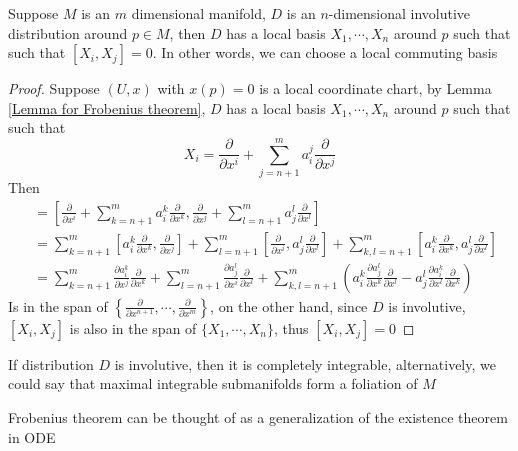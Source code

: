 \documentclass[../main.tex]{subfiles}
\begin{document}
\begin{corollary}\label{Involutive distribution ensure the existence of commuting basis}
Suppose $M$ is an $m$ dimensional manifold, $D$ is an $n$-dimensional involutive distribution around $p\in M$, then $D$ has a local basis $X_1,\cdots,X_n$ around $p$ such that such that $[X_i,X_j]=0$. In other words, we can choose a local commuting basis
\end{corollary}

\begin{proof}
Suppose $(U,x)$ with $x(p)=0$ is a local coordinate chart, by Lemma \ref{Lemma for Frobenius theorem}, $D$ has a local basis $X_1,\cdots,X_n$ around $p$ such that such that
\[X_i=\frac{\partial}{\partial x^i}+\sum_{j=n+1}^ma^j_i\frac{\partial}{\partial x^j}\]
Then
\begin{align*}
[X_i,X_j]&=\left[\frac{\partial}{\partial x^i}+\sum_{k=n+1}^ma^k_i\frac{\partial}{\partial x^k},\frac{\partial}{\partial x^j}+\sum_{l=n+1}^ma^l_j\frac{\partial}{\partial x^l}\right] \\
&=\sum_{k=n+1}^m\left[a^k_i\frac{\partial}{\partial x^k},\frac{\partial}{\partial x^j}\right]+\sum_{l=n+1}^m\left[\frac{\partial}{\partial x^i},a^l_j\frac{\partial}{\partial x^l}\right]+\sum_{k,l=n+1}^m\left[a^k_i\frac{\partial}{\partial x^k},a^l_j\frac{\partial}{\partial x^l}\right] \\
&=\sum_{k=n+1}^m\frac{\partial a^k_i}{\partial x^j}\frac{\partial}{\partial x^k}+\sum_{l=n+1}^m\frac{\partial a^l_j}{\partial x^i}\frac{\partial}{\partial x^l}+\sum_{k,l=n+1}^m\left(a^k_i\frac{\partial a^l_j}{\partial x^k}\frac{\partial}{\partial x^l}-a^l_j\frac{\partial a^k_i}{\partial x^l}\frac{\partial}{\partial x^k}\right)
\end{align*}
Is in the span of $\displaystyle\left\{\frac{\partial}{\partial x^{n+1}},\cdots,\frac{\partial}{\partial x^m}\right\}$, on the other hand, since $D$ is involutive, $[X_i,X_j]$ is also in the span of $\{X_1,\cdots,X_n\}$, thus $[X_i,X_j]=0$
\end{proof}

\begin{theorem}\label{Frobenius theorem}
If distribution $D$ is involutive, then it is completely integrable, alternatively, we could say that maximal integrable submanifolds form a foliation of $M$
\end{theorem}

\begin{remark}
Frobenius theorem can be thought of as a generalization of the existence theorem in ODE
\end{remark}
\end{document}
